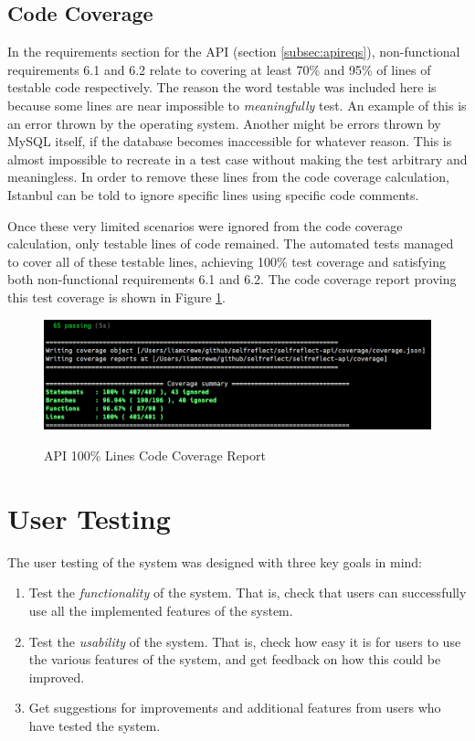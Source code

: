 \documentclass[11pt,openright,a4paper]{report}
\begin{document}
\subsection{Code Coverage}
In the requirements section for the API (section \ref{subsec:apireqs}), non-functional requirements 6.1 and 6.2 relate to covering at least 70\% and 95\% of lines of testable code respectively. The reason the word testable was included here is because some lines are near impossible to \emph{meaningfully} test. An example of this is an error thrown by the operating system. Another might be errors thrown by MySQL itself, if the database becomes inaccessible for whatever reason. This is almost impossible to recreate in a test case without making the test arbitrary and meaningless. In order to remove these lines from the code coverage calculation, Istanbul can be told to ignore specific lines using specific code comments.

Once these very limited scenarios were ignored from the code coverage calculation, only testable lines of code remained. The automated tests managed to cover all of these testable lines, achieving 100\% test coverage and satisfying both non-functional requirements 6.1 and 6.2. The code coverage report proving this test coverage is shown in Figure \ref{fig:codecoverage}.

\begin{figure}[ht]
\centering
\caption{API 100\% Lines Code Coverage Report}
\includegraphics[width=\textwidth]{i/codecoverage.png}
\label{fig:codecoverage}
\end{figure}

\newpage
\section{User Testing} \label{sec:usertesting}
The user testing of the system was designed with three key goals in mind:
\begin{enumerate}
\item Test the \emph{functionality} of the system. That is, check that users can successfully use all the implemented features of the system.
\item Test the \emph{usability} of the system. That is, check how easy it is for users to use the various features of the system, and get feedback on how this could be improved.
\item Get suggestions for improvements and additional features from users who have tested the system.
\end{enumerate}
\end{document}
